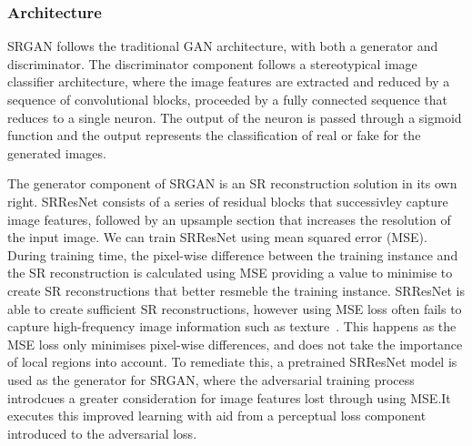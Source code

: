 \subsubsection{Architecture}
SRGAN follows the traditional GAN architecture, with both a generator and discriminator. The discriminator component follows a stereotypical image classifier architecture, where the image features are extracted and reduced by a sequence of convolutional blocks, proceeded by a fully connected sequence that reduces to a single neuron. The output of the neuron is passed through a sigmoid function and the output represents the classification of real or fake for the generated images.

The generator component of SRGAN is an SR reconstruction solution in its own right. SRResNet consists of a series of residual blocks that successivley capture image features, followed by an upsample section that increases the resolution of the input image. We can train SRResNet using mean squared error (MSE). During training time, the pixel-wise difference between the training instance and the SR reconstruction is calculated using MSE providing a value to minimise to create SR reconstructions that better resmeble the training instance. SRResNet is able to create sufficient SR reconstructions, however using MSE loss often fails to capture high-frequency image information such as texture~\cite{srgan}. This happens as the MSE loss only minimises pixel-wise differences, and does not take the importance of local regions into account. To remediate this, a pretrained SRResNet model is used as the generator for SRGAN, where the adversarial training process introdcues a greater consideration for image features lost through using MSE.\@ It executes this improved learning with aid from a perceptual loss component introduced to the adversarial loss.

